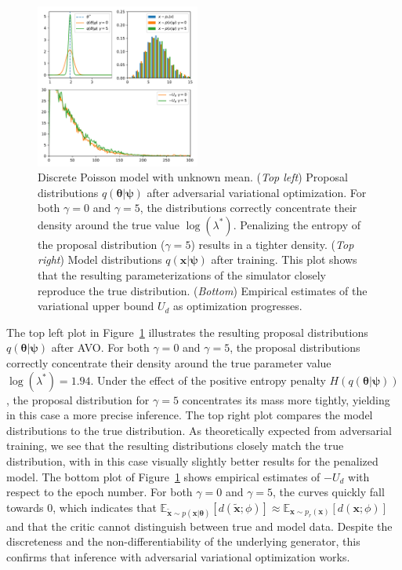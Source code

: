 \documentclass[twocolumn,superscriptaddress,aps]{revtex4-1}
\newcommand{\qxpsi}{q(\mathbf{x}|\bfpsi)}
\newcommand{\bftheta}{{\bm \theta}}
\newcommand{\bfpsi}{{\bm \psi}}
\theoremstyle{plain}
\begin{document}
\begin{figure}
    \centering
    \includegraphics[width=0.48\textwidth]{figures/poisson.pdf}
    \caption{Discrete Poisson model with unknown mean.
             ({\it Top left}) Proposal distributions $q(\bftheta|\bfpsi)$ after adversarial variational optimization. For both $\gamma=0$ and $\gamma=5$, the distributions correctly concentrate their density around
                        the true value $\log(\lambda^*)$. Penalizing the entropy of the proposal distribution ($\gamma=5$) results in a tighter density.
             ({\it Top right}) Model distributions $\qxpsi$ after training. This plot shows that the resulting parameterizations of the simulator closely reproduce the true distribution.
             ({\it Bottom}) Empirical estimates of the variational upper bound $U_d$ as optimization progresses.
             }\label{fig:poisson}
\end{figure}

The top left plot in Figure~\ref{fig:poisson} illustrates the resulting proposal
distributions $q(\bftheta|\bfpsi)$ after AVO.  For
both $\gamma=0$ and $\gamma=5$, the proposal distributions correctly concentrate
their density around the true parameter value $\log(\lambda^*) = 1.94$. Under
the effect of the positive entropy penalty $H(q(\bftheta|\bfpsi))$,
the proposal distribution for $\gamma=5$ concentrates its mass more tightly,
yielding in this case a more precise inference.  The top right plot compares the
model distributions to the true distribution.  As theoretically expected from
adversarial training, we see that the resulting distributions closely match
the true distribution, with in this case visually slightly better results for the penalized
model.  The bottom plot of Figure~\ref{fig:poisson} shows empirical estimates
of $-U_d$ with respect to the epoch number. For both $\gamma=0$ and $\gamma=5$,
the curves quickly fall towards $0$, which indicates that
$\mathbb{E}_{\tilde{\mathbf{x}} \sim p(\mathbf{x}|\bftheta)}
[d(\tilde{\mathbf{x}};\phi)] \approx \mathbb{E}_{\mathbf{x} \sim
p_r(\mathbf{x})} [d(\mathbf{x};\phi)]$ and that the critic cannot distinguish
between true and model data. Despite the discreteness and the
non-differentiability of the underlying generator, this confirms that inference
with adversarial variational optimization works.
\end{document}
